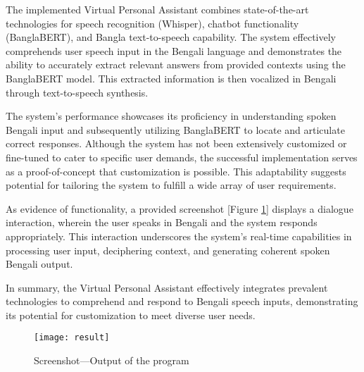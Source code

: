 The implemented Virtual Personal Assistant combines state-of-the-art technologies for speech recognition (Whisper), chatbot functionality (BanglaBERT), and Bangla text-to-speech capability.
The system effectively comprehends user speech input in the Bengali language and demonstrates the ability to accurately extract relevant answers from provided contexts using the BanglaBERT model.
This extracted information is then vocalized in Bengali through text-to-speech synthesis.

The system's performance showcases its proficiency in understanding spoken Bengali input and subsequently utilizing BanglaBERT to locate and articulate correct responses.
Although the system has not been extensively customized or fine-tuned to cater to specific user demands, the successful implementation serves as a proof-of-concept that customization is possible.
This adaptability suggests potential for tailoring the system to fulfill a wide array of user requirements.

As evidence of functionality, a provided screenshot [Figure \ref{fig:result}] displays a dialogue interaction, wherein the user speaks in Bengali and the system responds appropriately.
This interaction underscores the system's real-time capabilities in processing user input, deciphering context, and generating coherent spoken Bengali output.

In summary, the Virtual Personal Assistant effectively integrates prevalent technologies to comprehend and respond to Bengali speech inputs, demonstrating its potential for customization to meet diverse user needs.

\begin{figure}
    \centering
    \texttt{[image: result]}
    \caption{Screenshot—Output of the program}\label{fig:result}
\end{figure}
